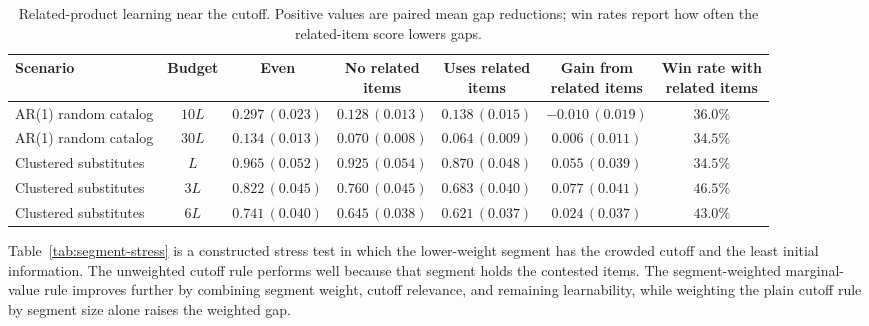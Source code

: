 \documentclass[11pt]{article}
\theoremstyle{definition}
\theoremstyle{remark}
\newcommand{\1}{\mathbf{1}}
\begin{document}
\begin{table}[h!]
\centering
\scriptsize
\setlength{\tabcolsep}{3pt}
\begin{tabular}{lcccccc}
\toprule
Scenario & Budget & Even & \shortstack{No related\\items} & \shortstack{Uses related\\items} & \shortstack{Gain from\\related items} & \shortstack{Win rate with\\related items} \\
\midrule
AR(1) random catalog & \(10L\) & $0.297\,(0.023)$ & $0.128\,(0.013)$ & $0.138\,(0.015)$ & $-0.010\,(0.019)$ & $36.0\%$ \\
AR(1) random catalog & \(30L\) & $0.134\,(0.013)$ & $0.070\,(0.008)$ & $0.064\,(0.009)$ & $0.006\,(0.011)$ & $34.5\%$ \\
\midrule
Clustered substitutes & \(L\)  & $0.965\,(0.052)$ & $0.925\,(0.054)$ & $0.870\,(0.048)$ & $0.055\,(0.039)$ & $34.5\%$ \\
Clustered substitutes & \(3L\) & $0.822\,(0.045)$ & $0.760\,(0.045)$ & $0.683\,(0.040)$ & $0.077\,(0.041)$ & $46.5\%$ \\
Clustered substitutes & \(6L\) & $0.741\,(0.040)$ & $0.645\,(0.038)$ & $0.621\,(0.037)$ & $0.024\,(0.037)$ & $43.0\%$ \\
\bottomrule
\end{tabular}
\caption{Related-product learning near the cutoff. Positive values are paired mean gap
reductions; win rates report how often the related-item score lowers gaps.}
\label{tab:correlation-spillover}
\end{table}

Table~\ref{tab:segment-stress} is a constructed stress test in which
the lower-weight segment has the crowded cutoff and the least initial
information. The unweighted cutoff rule performs well because that
segment holds the contested items. The segment-weighted marginal-value
rule improves further by combining segment weight, cutoff relevance,
and remaining learnability, while weighting the plain cutoff rule by
segment size alone raises the weighted gap.
\end{document}
